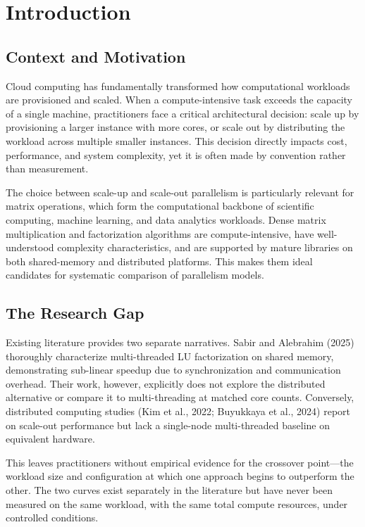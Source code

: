 \chapter{Introduction}

\section{Context and Motivation}

Cloud computing has fundamentally transformed how computational workloads are provisioned and scaled. When a compute-intensive task exceeds the capacity of a single machine, practitioners face a critical architectural decision: scale up by provisioning a larger instance with more cores, or scale out by distributing the workload across multiple smaller instances. This decision directly impacts cost, performance, and system complexity, yet it is often made by convention rather than measurement.

The choice between scale-up and scale-out parallelism is particularly relevant for matrix operations, which form the computational backbone of scientific computing, machine learning, and data analytics workloads. Dense matrix multiplication and factorization algorithms are compute-intensive, have well-understood complexity characteristics, and are supported by mature libraries on both shared-memory and distributed platforms. This makes them ideal candidates for systematic comparison of parallelism models.

\section{The Research Gap}

Existing literature provides two separate narratives. Sabir and Alebrahim (2025) thoroughly characterize multi-threaded LU factorization on shared memory, demonstrating sub-linear speedup due to synchronization and communication overhead. Their work, however, explicitly does not explore the distributed alternative or compare it to multi-threading at matched core counts. Conversely, distributed computing studies (Kim et al., 2022; Buyukkaya et al., 2024) report on scale-out performance but lack a single-node multi-threaded baseline on equivalent hardware.

This leaves practitioners without empirical evidence for the crossover point—the workload size and configuration at which one approach begins to outperform the other. The two curves exist separately in the literature but have never been measured on the same workload, with the same total compute resources, under controlled conditions.


